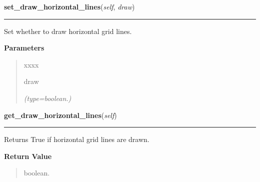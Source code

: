     \label{pygtk_chart:line_chart:Grid:set_draw_horizontal_lines}

    \vspace{0.5ex}

\hspace{.8\funcindent}\begin{boxedminipage}{\funcwidth}

    \raggedright \textbf{set\_draw\_horizontal\_lines}(\textit{self}, \textit{draw})

    \vspace{-1.5ex}

    \rule{\textwidth}{0.5\fboxrule}
\setlength{\parskip}{2ex}
    Set whether to draw horizontal grid lines.

\setlength{\parskip}{1ex}
      \textbf{Parameters}
      \vspace{-1ex}

      \begin{quote}
        \begin{Ventry}{xxxx}

          \item[draw]

            {\it (type=boolean.)}

        \end{Ventry}

      \end{quote}

    \end{boxedminipage}

    \label{pygtk_chart:line_chart:Grid:get_draw_horizontal_lines}

    \vspace{0.5ex}

\hspace{.8\funcindent}\begin{boxedminipage}{\funcwidth}

    \raggedright \textbf{get\_draw\_horizontal\_lines}(\textit{self})

    \vspace{-1.5ex}

    \rule{\textwidth}{0.5\fboxrule}
\setlength{\parskip}{2ex}
    Returns True if horizontal grid lines are drawn.

\setlength{\parskip}{1ex}
      \textbf{Return Value}
    \vspace{-1ex}

      \begin{quote}
      boolean.

      \end{quote}

    \end{boxedminipage}

